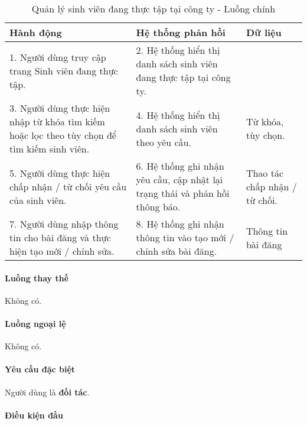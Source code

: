 \documentclass[./../main.tex]{subfiles}
\begin{document}
\begin{table}[H]
	\caption{Quản lý sinh viên đang thực tập tại công ty - Luồng chính}
	\label{tab:partner_manage_students}
	\begin{tabularx}{\textwidth}{|X|X|X|}
		\hline
		\textbf{Hành động}                                                                          & \textbf{Hệ thống phản hồi}                                                   & \textbf{Dữ liệu}              \\ \hline
		1. Người dùng truy cập trang Sinh viên đang thực tập.                                       & 2. Hệ thống hiển thị danh sách sinh viên đang thực tập tại công ty.          &                               \\ \hline
		3. Người dùng thực hiện nhập từ khóa tìm kiếm hoặc lọc theo tùy chọn để tìm kiếm sinh viên. & 4. Hệ thống hiển thị danh sách sinh viên theo yêu cầu.                       & Từ khóa, tùy chọn.            \\ \hline
		5. Người dùng thực hiện chấp nhận / từ chối yêu cầu của sinh viên.                          & 6. Hệ thống ghi nhận yêu cầu, cập nhật lại trạng thái và phản hồi thông báo. & Thao tác chấp nhận / từ chối. \\ \hline
		7. Người dùng nhập thông tin cho bài đăng và thực hiện tạo mới / chỉnh sửa.                 & 8. Hệ thống ghi nhận thông tin vào tạo mới / chỉnh sửa bài đăng.             & Thông tin bài đăng            \\ \hline
	\end{tabularx}
\end{table}

\paragraph*{Luồng thay thế} Không có.

\paragraph*{Luồng ngoại lệ} Không có.

\paragraph*{Yêu cầu đặc biệt}

Người dùng là \textbf{đối tác}.

\paragraph*{Điều kiện đầu}
\end{document}
